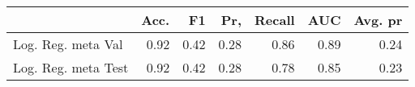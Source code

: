 \begin{tabular}{lrrrrrr}
\toprule
{} &  Acc. &    F1 &   Pr, &  Recall &   AUC &  Avg. pr \\
\midrule
Log. Reg. meta Val  &  0.92 &  0.42 &  0.28 &    0.86 &  0.89 &     0.24 \\
Log. Reg. meta Test &  0.92 &  0.42 &  0.28 &    0.78 &  0.85 &     0.23 \\
\bottomrule
\end{tabular}
